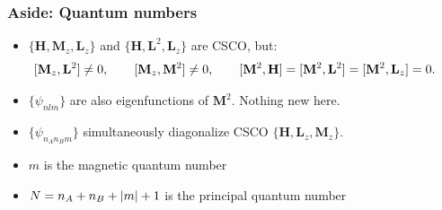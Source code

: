\documentclass{beamer}
\theoremstyle{definition}
\begin{document}
\begin{frame}
\frametitle{Aside: Quantum numbers}


\begin{itemize}

\item $\{ \mathbf{H}, \mathbf{M}_z, \mathbf{L}_z \}$ and $\{ \mathbf{H}, \mathbf{L}^2, \mathbf{L}_z \}$ are CSCO, but:
\begin{align*}
\hspace{-15pt}
[\mathbf{M}_z, \mathbf{L}^2] \neq 0, 
\quad\quad 
[\mathbf{M}_z, \mathbf{M}^2] \neq 0, 
\quad\quad 
[\mathbf{M}^2, \mathbf{H}] = [\mathbf{M}^2, \mathbf{L}^2] = [\mathbf{M}^2, \mathbf{L}_z] = 0.
\end{align*}

\item $\{\psi_{nlm}\}$ are also eigenfunctions of $\mathbf{M}^2$. Nothing new here.
\item $\{ \psi_{n_A n_B m} \}$ simultaneously diagonalize CSCO $\{ \mathbf{H}, \mathbf{L}_z, \mathbf{M}_z  \}$.
\item $m$ is the magnetic quantum number
\item $N = n_A + n_B + \abs{m} + 1$ is the principal quantum number

\end{itemize}

\end{frame}
\end{document}
